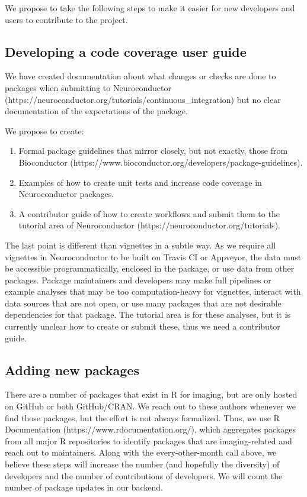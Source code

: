 \documentclass[]{elsarticle} %
\providecommand{\tightlist}{%
  \setlength{\itemsep}{0pt}\setlength{\parskip}{0pt}}
\begin{document}
We propose to take the following steps to make it easier for new developers and users to contribute to the project.

\hypertarget{developing-a-code-coverage-user-guide}{%
\subsection{Developing a code coverage user guide}\label{developing-a-code-coverage-user-guide}}

We have created documentation about what changes or checks are done to packages when submitting to Neuroconductor (https://neuroconductor.org/tutorials/continuous\_integration) but no clear documentation of the expectations of the package.

We propose to create:

\begin{enumerate}
\def\labelenumi{\arabic{enumi}.}
\tightlist
\item
  Formal package guidelines that mirror closely, but not exactly, those from Bioconductor
  (https://www.bioconductor.org/developers/package-guidelines).
\item
  Examples of how to create unit tests and increase code coverage in Neuroconductor packages.
\item
  A contributor guide of how to create workflows and submit them to the tutorial area of Neuroconductor (https://neuroconductor.org/tutorials).
\end{enumerate}

The last point is different than vignettes in a subtle way. As we require all vignettes in Neuroconductor to be built on Travis CI or Appveyor, the data must be accessible programmatically, enclosed in the package, or use data from other packages. Package maintainers and developers may make full pipelines or example analyses that may be too computation-heavy for vignettes, interact with data sources that are not open, or use many packages that are not desirable dependencies for that package. The tutorial area is for these analyses, but it is currently unclear how to create or submit these, thus we need a contributor guide.

\hypertarget{adding-new-packages}{%
\subsection{Adding new packages}\label{adding-new-packages}}

There are a number of packages that exist in R for imaging, but are only hosted on GitHub or both GitHub/CRAN. We reach out to these authors whenever we find those packages, but the effort is not always formalized. Thus, we use R Documentation (https://www.rdocumentation.org/), which aggregates packages from all major R repositories to identify packages that are imaging-related and reach out to maintainers. Along with the every-other-month call above, we believe these steps will increase the number (and hopefully the diversity) of developers and the number of contributions of developers. We will count the number of package updates in our backend.
\end{document}
